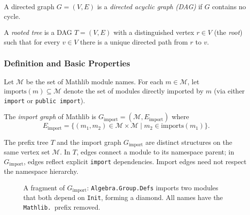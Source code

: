 \begin{definition}
A directed graph $G = (V, E)$ is a \emph{directed acyclic graph (DAG)} if $G$ contains no cycle.
\end{definition}

\begin{definition}
A \emph{rooted tree} is a DAG $T = (V, E)$ with a distinguished vertex $r \in V$ (the \emph{root}) such that for every $v \in V$ there is a unique directed path from $r$ to $v$.
\end{definition}

\subsubsection{Definition and Basic Properties}

Let $\mathcal{M}$ be the set of Mathlib module names. For each $m \in \mathcal{M}$, let $\mathrm{imports}(m) \subseteq \mathcal{M}$ denote the set of modules directly imported by $m$ (via either \texttt{import} or \texttt{public import}).

\begin{definition}
The \emph{import graph} of Mathlib is $G_{\mathrm{import}} = (\mathcal{M}, E_{\mathrm{import}})$ where
\[
  E_{\mathrm{import}} = \{(m_1, m_2) \in \mathcal{M} \times \mathcal{M} \mid m_2 \in \mathrm{imports}(m_1)\}.
\]
\end{definition}

\begin{remark}
The prefix tree $T$ and the import graph $G_{\mathrm{import}}$ are distinct structures on the same vertex set $\mathcal{M}$. In $T$, edges connect a module to its namespace parent; in $G_{\mathrm{import}}$, edges reflect explicit \texttt{import} dependencies. Import edges need not respect the namespace hierarchy.
\end{remark}

\begin{figure}[ht]
\centering
{}
\caption{A fragment of $G_{\mathrm{import}}$: \texttt{Algebra.Group.Defs} imports two modules that both depend on \texttt{Init}, forming a diamond. All names have the \texttt{Mathlib.}\ prefix removed.}
\label{fig:import-subgraph}
\end{figure}


